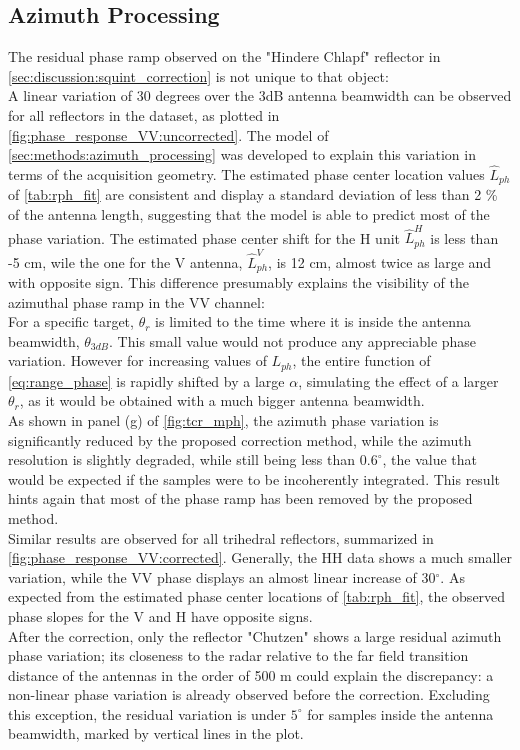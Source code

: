 \subsection{Azimuth Processing}\label{sec:discussion:azimuth_processing}
The residual phase ramp observed on the "Hindere Chlapf" reflector in \autoref{sec:discussion:squint_correction} is not unique to that object:\\ A linear variation of 30 degrees over the 3dB antenna beamwidth can be observed for all reflectors in the dataset, as plotted in \autoref{fig:phase_response_VV:uncorrected}.  The model of \autoref{sec:methods:azimuth_processing} was developed to explain this variation in terms of the acquisition geometry.
The estimated phase center location values $\hat{L}_{ph}$ of \autoref{tab:rph_fit} are consistent and display a standard deviation of less than 2 \% of the antenna length, suggesting that the model is able to predict most of the phase variation. The estimated phase center shift for the H unit $\hat{L}_{ph}^{H}$ is less than -5 cm, wile the one for the V antenna, $\hat{L}_{ph}^{V}$, is 12 cm, almost twice as large and with opposite sign. This difference presumably explains the visibility of the azimuthal phase ramp in the VV channel:\\
For a specific target,  $\theta_r$ is limited to the time where it is inside the antenna beamwidth, $\theta_{3dB}$. This small value would not produce any appreciable phase variation. However for increasing values of $L_{ph}$, the entire function of \autoref{eq:range_phase} is rapidly shifted  by a large $\alpha$, simulating the effect of a larger $\theta_r$, as it would be obtained with a much bigger antenna beamwidth.\\
As shown in panel (g) of \autoref{fig:tcr_mph}, the azimuth phase variation is significantly reduced by the proposed correction method, while the azimuth resolution is slightly degraded, while still being less than $0.6^\circ$, the value that would be expected if the samples were to be incoherently integrated. This result hints again that most of the phase ramp has been removed by the proposed method.\\
Similar results are observed for all trihedral reflectors, summarized in \autoref{fig:phase_response_VV:corrected}.  Generally, the HH data shows a much smaller variation, while the VV phase displays an almost linear increase of 30$^\circ$. As expected from the estimated phase center locations of \autoref{tab:rph_fit}, the observed phase slopes for the V and H have opposite signs.\\  After the correction, only the reflector "Chutzen" shows a large residual azimuth phase variation; its closeness to the radar relative to the far field transition distance of the antennas in the order of 500 m could explain the discrepancy: a non-linear  phase variation is already observed before the correction. Excluding this exception, the residual variation is under $5^\circ$ for samples inside the antenna beamwidth, marked by vertical lines in the plot.
